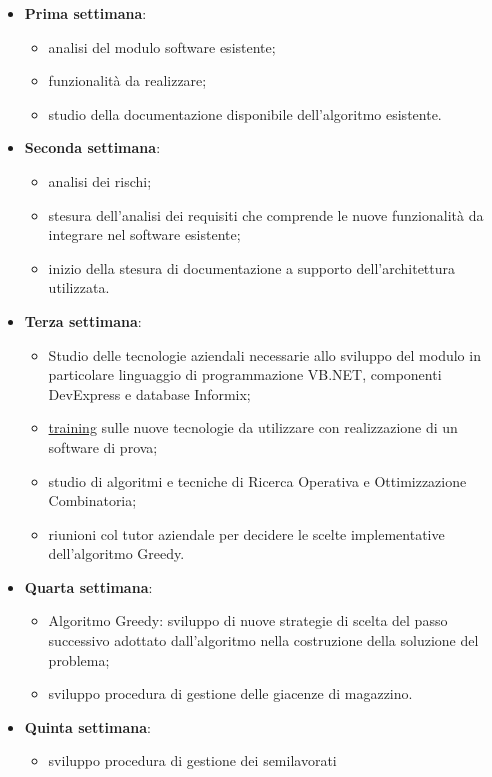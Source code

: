 \begin{itemize}
	\item \textbf{Prima settimana}:
	\begin{itemize}
		 \item analisi del modulo software esistente;
		 \item funzionalità da realizzare;
	 	 \item studio della documentazione disponibile dell’algoritmo esistente.
	\end{itemize}
	\item \textbf{Seconda settimana}: 
	\begin{itemize}
		\item analisi dei rischi;
		\item stesura dell'analisi dei requisiti che comprende le nuove funzionalità da integrare nel software esistente;
		\item  inizio della stesura di documentazione a supporto dell'architettura utilizzata.
	\end{itemize}
	\item \textbf{Terza settimana}:
		\begin{itemize}
		\item Studio delle tecnologie aziendali necessarie allo sviluppo del
		modulo in particolare linguaggio di programmazione VB.NET, componenti
		DevExpress e database Informix;
		\item  \hyperref[Training]{training\glo} sulle nuove tecnologie da utilizzare con realizzazione di un software di prova;
		\item studio di algoritmi e tecniche di Ricerca Operativa e	Ottimizzazione Combinatoria;
		\item riunioni col tutor aziendale per decidere le scelte implementative dell'algoritmo Greedy.
	\end{itemize}
	\item \textbf{Quarta settimana}:
		\begin{itemize}
		\item Algoritmo Greedy: sviluppo di nuove strategie di scelta
		del passo successivo adottato dall’algoritmo nella
		costruzione della soluzione del problema;
		\item sviluppo procedura di gestione delle giacenze di
		magazzino.
		\end{itemize}
	\item \textbf{Quinta settimana}:
		\begin{itemize}
		\item sviluppo procedura di gestione dei semilavorati

\end{itemize}
\end{itemize}
